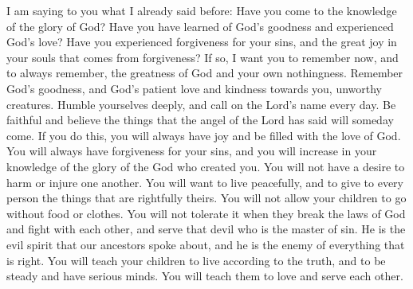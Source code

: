 I am saying to you what I already said before: Have you come to the knowledge of the glory of God? Have you have learned of God's goodness and experienced God's love? Have you experienced forgiveness for your sins, and the great joy in your souls that comes from forgiveness? If so, I want you to remember now, and to always remember, the greatness of God and your own nothingness. Remember God's goodness, and God's patient love and kindness towards you, unworthy creatures. Humble yourselves deeply, and call on the Lord's name every day. Be faithful and believe the things that the angel of the Lord has said will someday come.
\bverse \iffalse And behold, I say unto you that if ye do this ye shall always rejoice, and be filled with the love of God, and always retain a remission of your sins; and ye shall grow in the knowledge of the glory of him that created you, or in the knowledge of that which is just and true. \fi
If you do this, you will always have joy and be filled with the love of God. You will always have forgiveness for your sins, and you will increase in your knowledge of the glory of the God who created you.
\bverse \iffalse And ye will not have a mind to injure one another, but to live peaceably, and to render to every man according to that which is his due. \fi
You will not have a desire to harm or injure one another. You will want to live peacefully, and to give to every person the things that are rightfully theirs.
\bverse \iffalse And ye will not suffer your children that they go hungry, or naked; neither will ye suffer that they transgress the laws of God, and fight and quarrel one with another, and serve the devil, who is the master of sin, or who is the evil spirit which hath been spoken of by our fathers, he being an enemy to all righteousness. \fi
You will not allow your children to go without food or clothes. You will not tolerate it when they break the laws of God and fight with each other, and serve that devil who is the master of sin. He is the evil spirit that our ancestors spoke about, and he is the enemy of everything that is right.
\bverse \iffalse But ye will teach them to walk in the ways of truth and soberness; ye will teach them to love one another, and to serve one another. \fi
You will teach your children to live according to the truth, and to be steady and have serious minds. You will teach them to love and serve each other.
\bverse \iffalse And also, ye yourselves will succor those that stand in need of your succor; ye will administer of your substance unto him that standeth in need; and ye will not suffer that the beggar putteth up his petition to you in vain, and turn him out to perish. \fi
